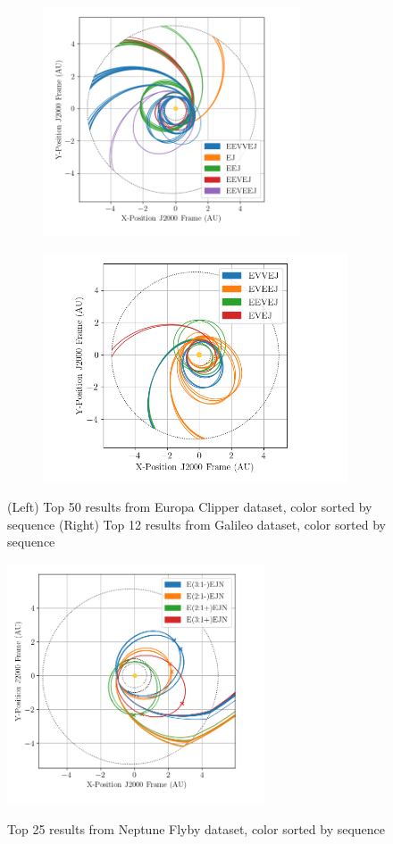 \documentclass[letterpaper, paper,11pt]{AAS}	%
\begin{document}
\begin{figure}[h!]
    \begin{subfigure}{}
        \includegraphics[width=3in]{./fig/clipperFamilies.png}
        \label{fig:clipFam}
    \end{subfigure}
    \begin{subfigure}{}
        \includegraphics[width=3.55in]{./fig/galileoFamilies.png}
        \label{fig:galiFam}
    \end{subfigure}
    \caption{(Left) Top 50 results from Europa Clipper dataset, color sorted by sequence (Right) Top 12 results from Galileo dataset, color sorted by sequence}
\end{figure}
\begin{figure}[h]
    \centering
    \includegraphics[width=3in]{./fig/tridentFamilies.png}
    \label{fig:tridFam}
    \caption{Top 25 results from Neptune Flyby dataset, color sorted by sequence}
\end{figure}


\clearpage
{}
\end{document}
